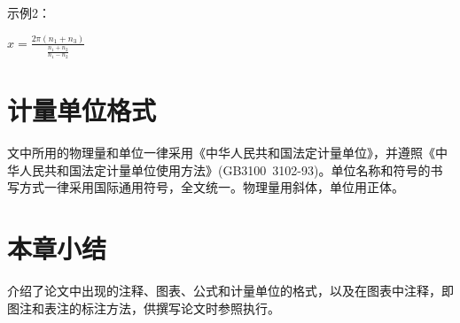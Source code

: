      示例2：
     
     {\large $x = \frac{{2\pi ({n_1} + {n_3})}}{{\frac{{{n_1} + {n_2}}}{{{n_1} - {n_2}}}}}$}
     
     
\section{计量单位格式}

文中所用的物理量和单位一律采用《中华人民共和国法定计量单位》，并遵照《中华人民共和国法定计量单位使用方法》(GB3100~3102-93)。单位名称和符号的书写方式一律采用国际通用符号，全文统一。物理量用斜体，单位用正体。

\section{本章小结}

介绍了论文中出现的注释、图表、公式和计量单位的格式，以及在图表中注释，即图注和表注的标注方法，供撰写论文时参照执行。 

\newpage\quad %

